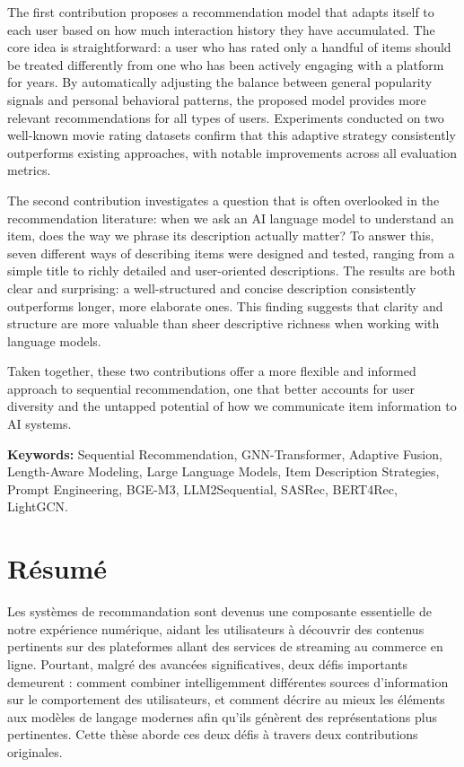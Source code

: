 \documentclass[12pt,a4paper]{report}
\begin{document}
The first contribution proposes a recommendation model that adapts itself to each user based
on how much interaction history they have accumulated. The core idea is straightforward: a
user who has rated only a handful of items should be treated differently from one who has
been actively engaging with a platform for years. By automatically adjusting the balance
between general popularity signals and personal behavioral patterns, the proposed model
provides more relevant recommendations for all types of users. Experiments conducted on
two well-known movie rating datasets confirm that this adaptive strategy consistently
outperforms existing approaches, with notable improvements across all evaluation metrics.

The second contribution investigates a question that is often overlooked in the
recommendation literature: when we ask an AI language model to understand an item, does
the way we phrase its description actually matter? To answer this, seven different ways of
describing items were designed and tested, ranging from a simple title to richly detailed and
user-oriented descriptions. The results are both clear and surprising: a well-structured and
concise description consistently outperforms longer, more elaborate ones. This finding
suggests that clarity and structure are more valuable than sheer descriptive richness when
working with language models.

Taken together, these two contributions offer a more flexible and informed approach to
sequential recommendation, one that better accounts for user diversity and the untapped
potential of how we communicate item information to AI systems.

\vspace{0.5cm}
\textbf{Keywords:} Sequential Recommendation, GNN-Transformer, Adaptive Fusion, Length-Aware Modeling, Large Language Models, Item Description Strategies, Prompt Engineering, BGE-M3, LLM2Sequential, SASRec, BERT4Rec, LightGCN.

\newpage
\section*{Résumé}
\vspace{0.5cm}

Les systèmes de recommandation sont devenus une composante essentielle de notre
expérience numérique, aidant les utilisateurs à découvrir des contenus pertinents sur des
plateformes allant des services de streaming au commerce en ligne. Pourtant, malgré des
avancées significatives, deux défis importants demeurent : comment combiner intelligemment
différentes sources d'information sur le comportement des utilisateurs, et comment décrire au
mieux les éléments aux modèles de langage modernes afin qu'ils génèrent des représentations
plus pertinentes. Cette thèse aborde ces deux défis à travers deux contributions originales.
\end{document}
